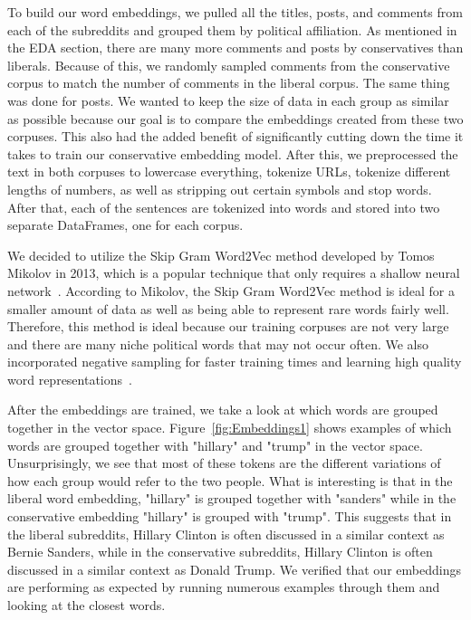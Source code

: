 \documentclass[conference]{IEEEtran}
\begin{document}
To build our word embeddings, we pulled all the titles, posts, and comments from each of the subreddits and grouped them by political affiliation. As mentioned in the EDA section, there are many more comments and posts by conservatives than liberals. Because of this, we randomly sampled comments from the conservative corpus to match the number of comments in the liberal corpus. The same thing was done for posts. We wanted to keep the size of data in each group as similar as possible because our goal is to compare the embeddings created from these two corpuses. This also had the added benefit of significantly cutting down the time it takes to train our conservative embedding model. After this, we preprocessed the text in both corpuses to lowercase everything, tokenize URLs, tokenize different lengths of numbers, as well as stripping out certain symbols and stop words. After that, each of the sentences are tokenized into words and stored into two separate DataFrames, one for each corpus.
 
We decided to utilize the Skip Gram Word2Vec method developed by Tomos Mikolov in 2013, which is a popular technique that only requires a shallow neural network~\cite{mikolov2013efficient}.  According to Mikolov, the Skip Gram Word2Vec method is ideal for a smaller amount of data as well as being able to represent rare words fairly well. Therefore, this method is ideal because our training corpuses are not very large and there are many niche political words that may not occur often. We also incorporated negative sampling for faster training times and learning high quality word representations~\cite{mikolov2013distributed}.
 
 
After the embeddings are trained, we take a look at which words are grouped together in the vector space. Figure~\ref{fig:Embeddings1} shows examples of which words are grouped together with "hillary" and "trump" in the vector space. Unsurprisingly, we see that most of these tokens are the different variations of how each group would refer to the two people. What is interesting is that in the liberal word embedding, "hillary" is grouped together with "sanders" while in the conservative embedding "hillary" is grouped with "trump". This suggests that in the liberal subreddits, Hillary Clinton is often discussed in a similar context as Bernie Sanders, while in the conservative subreddits, Hillary Clinton is often discussed in a similar context as Donald Trump. We verified that our embeddings are performing as expected by running numerous examples through them and looking at the closest words.
 
\end{document}
